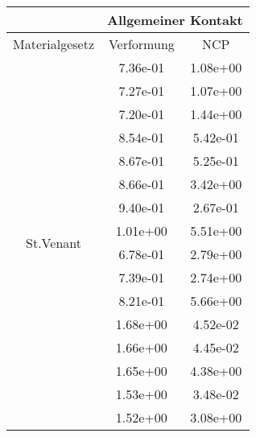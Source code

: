 \begin{table} 
\centering 
\begin{tabular}{c|cc|} 
\cline{2-3} 
 & \multicolumn{2}{|c|}{Allgemeiner Kontakt} \\ 
\hline 
\multicolumn{1}{|c|}{Materialgesetz} & \multicolumn{1}{c|}{Verformung} & \multicolumn{1}{c|}{NCP} \\ 
\hline 
\multicolumn{1}{|c|}{\multirow{101}{*}{St.Venant}} &\multicolumn{1}{|c|}{  7.36e-01} & \multicolumn{1}{|c|}{  1.08e+00} \\ 
\multicolumn{1}{|c|}{} & \multicolumn{1}{|c|}{  7.27e-01} & \multicolumn{1}{|c|}{  1.07e+00} \\ 
\multicolumn{1}{|c|}{} & \multicolumn{1}{|c|}{  7.20e-01} & \multicolumn{1}{|c|}{  1.44e+00} \\ 
\multicolumn{1}{|c|}{} & \multicolumn{1}{|c|}{  8.54e-01} & \multicolumn{1}{|c|}{  5.42e-01} \\ 
\multicolumn{1}{|c|}{} & \multicolumn{1}{|c|}{  8.67e-01} & \multicolumn{1}{|c|}{  5.25e-01} \\ 
\multicolumn{1}{|c|}{} & \multicolumn{1}{|c|}{  8.66e-01} & \multicolumn{1}{|c|}{  3.42e+00} \\ 
\multicolumn{1}{|c|}{} & \multicolumn{1}{|c|}{  9.40e-01} & \multicolumn{1}{|c|}{  2.67e-01} \\ 
\multicolumn{1}{|c|}{} & \multicolumn{1}{|c|}{  1.01e+00} & \multicolumn{1}{|c|}{  5.51e+00} \\ 
\multicolumn{1}{|c|}{} & \multicolumn{1}{|c|}{  6.78e-01} & \multicolumn{1}{|c|}{  2.79e+00} \\ 
\multicolumn{1}{|c|}{} & \multicolumn{1}{|c|}{  7.39e-01} & \multicolumn{1}{|c|}{  2.74e+00} \\ 
\multicolumn{1}{|c|}{} & \multicolumn{1}{|c|}{  8.21e-01} & \multicolumn{1}{|c|}{  5.66e+00} \\ 
\multicolumn{1}{|c|}{} & \multicolumn{1}{|c|}{  1.68e+00} & \multicolumn{1}{|c|}{  4.52e-02} \\ 
\multicolumn{1}{|c|}{} & \multicolumn{1}{|c|}{  1.66e+00} & \multicolumn{1}{|c|}{  4.45e-02} \\ 
\multicolumn{1}{|c|}{} & \multicolumn{1}{|c|}{  1.65e+00} & \multicolumn{1}{|c|}{  4.38e+00} \\ 
\multicolumn{1}{|c|}{} & \multicolumn{1}{|c|}{  1.53e+00} & \multicolumn{1}{|c|}{  3.48e-02} \\ 
\multicolumn{1}{|c|}{} & \multicolumn{1}{|c|}{  1.52e+00} & \multicolumn{1}{|c|}{  3.08e+00} \\ 

\end{tabular}
\end{table}
